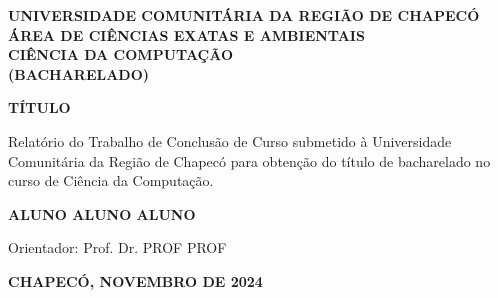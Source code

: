     \begin{center}
    \vspace{1cm}
    
    \textbf{\MakeTextUppercase{Universidade Comunitária da Região de Chapecó}\\}
    \textbf{\MakeTextUppercase{Área de ciências exatas e ambientais}\\}
    \textbf{\MakeTextUppercase{Ciência da Computação}\\}
    \textbf{\MakeTextUppercase{(Bacharelado)}\\}

    \vspace{6cm}

    \MakeUppercase{\textbf{TÍTULO}}

    \end{center}

    \vspace{3cm}

    \begin{flushright}
        \hspace*{7cm}
        \begin{minipage}{0.5\textwidth}
            \bfseries
            \SingleSpacing

                        Relatório do Trabalho de Conclusão de Curso submetido à Universidade Comunitária da Região de Chapecó para obtenção do título de bacharelado no curso de Ciência da Computação.

        
        \end{minipage}
    \end{flushright}

    \vspace{0.5cm}
    \begin{center}
    \textbf{\MakeTextUppercase{ALUNO ALUNO ALUNO}}
    \end{center}
    \vspace{0.5cm}

    {
        \hspace*{7cm}
        \begin{minipage}{0.5\textwidth}
            \mdseries
            \SingleSpacing

            Orientador: Prof. Dr. PROF PROF
        \end{minipage}
    }

    \vfill

    \begin{center}
    \textbf{\MakeTextUppercase{Chapecó, novembro DE 2024}}
    \end{center}